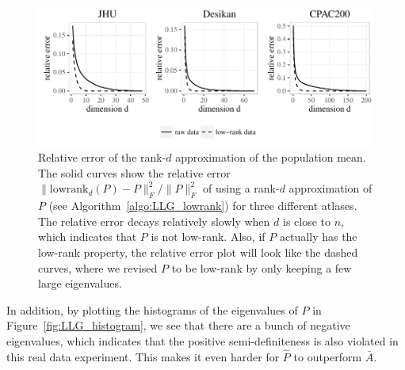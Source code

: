 \begin{figure}[!htbp]
\centering
\includegraphics[width=.6\textheight]{./Figures/screeplot_ratio_all.pdf} 
\caption[Relative error of the low-rank approximation of the population mean]{Relative error of the rank-$d$ approximation of the population mean.
The solid curves show the relative error $\|\mathrm{lowrank}_d(P)-P\|_F^2/\|P\|_F^2$ of using a rank-$d$ approximation of $P$ (see Algorithm~\ref{algo:LLG_lowrank}) for three different atlases.
The relative error decays relatively slowly when $d$ is close to $n$, which indicates that $P$ is not low-rank.
Also, if $P$ actually has the low-rank property, the relative error plot will look like the dashed curves, where we revised $P$ to be low-rank by only keeping a few large eigenvalues. }
\label{fig:LLG_screeplot}
\end{figure}

In addition, by plotting the histograms of the eigenvalues of $P$ in Figure~\ref{fig:LLG_histogram}, we see that there are a bunch of negative eigenvalues, which indicates that the positive semi-definiteness is also violated in this real data experiment. This makes it even harder for $\hat{P}$ to outperform $\bar{A}$. 

